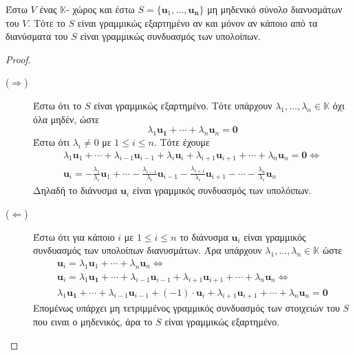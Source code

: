 \begin{thm}\label{thm:s1s2depend}
    Έστω $V$ ένας $ \mathbb{K} $- χώρος και έστω 
    $ S = \{ \mathbf{u}_{1}, \ldots, \mathbf{u_{n}} \} $ μη μηδενικό σύνολο 
    διανυσμάτων του $V$. Τότε το $S$ είναι γραμμικώς εξαρτημένο αν και μόνον αν 
    κάποιο από τα διανύσματα του $S$ είναι γραμμικώς συνδυασμός των υπολοίπων. 
\end{thm}
\begin{proof}
\item {}
    \begin{description}
        \item [($ \Rightarrow $)] Έστω ότι το $S$ είναι γραμμικώς εξαρτημένο. Τότε 
            υπάρχουν $ \lambda _{1}, \ldots, \lambda_{n} \in \mathbb{K} $ όχι 
            όλα μηδέν, ώστε 
            \[
                \lambda _{1} \mathbf{u_{1}} + \cdots + \lambda _{n} \mathbf{u}_{n} = 
                \mathbf{0}  
            \] 
            Έστω ότι $ \lambda _{i} \neq 0 $ με $ 1 \leq i \leq n $. Τότε έχουμε
            \begin{align*}
                \lambda _{1} \mathbf{u}_{1} + \cdots + \lambda _{i-1} 
                \mathbf{u}_{i-1} + \lambda _{i} \mathbf{u}_{i} + \lambda _{i+1} 
                \mathbf{u}_{i+1} + \cdots + \lambda _{n}
                \mathbf{u}_{n} = \mathbf{0} \Leftrightarrow  \\
                \mathbf{u}_{i} = - \frac{\lambda _{1}}{\lambda _{i}} \mathbf{u}_{1} +
                \cdots - \frac{\lambda _{i-1}}{\lambda _{i}} \mathbf{u}_{i-1} - 
                \frac{\lambda _{i+1}}{\lambda _{i}} \mathbf{u}_{i+1} - 
                \cdots - \frac{\lambda _{n}}{\lambda _{i}} \mathbf{u}_{n} 
             \end{align*} 
             Δηλαδή το διάνυσμα $ \mathbf{u}_{i} $ είναι γραμμικός συνδυασμός των 
             υπολόιπων.
         \item [($\Leftarrow$)] 
             Έστω ότι για κάποιο $ i $ με $ 1 \leq i \leq n $ το διάνυσμα 
             $ \mathbf{u}_{i} $ είναι γραμμικός συνδυασμός των υπολοίπων διανυσμάτων.
             Άρα υπάρχουν $ \lambda _{1}, \ldots, \lambda _{n} \in \mathbb{K} $ 
             ώστε 
             \begin{gather*}
                 \mathbf{u}_{i} = \lambda _{1} \mathbf{u}_{1} + \cdots + 
                 \lambda _{n} \mathbf{u}_{n} \Leftrightarrow \\
                 \mathbf{u}_{i} = \lambda _{1} \mathbf{u_{1}} + \cdots + 
                 \lambda _{i-1}
                 \mathbf{u}_{i-1} + \lambda _{i+1} \mathbf{u}_{i+1} + \cdots + 
                 \lambda _{n} \mathbf{u}_{n} \Leftrightarrow \\
                 \lambda _{1} \mathbf{u_{1}} + \cdots + \lambda _{i-1}
                 \mathbf{u}_{i-1} + (-1) \cdot \mathbf{u}_{i} + \lambda _{i+1} 
                 \mathbf{u}_{i+1} + \cdots + \lambda _{n} \mathbf{u}_{n} = \mathbf{0}
             \end{gather*}
             Επομένως υπάρχει μη τετριμμένος γραμμικός συνδυασμός των στοιχειών του 
             $S$ που ειναι ο μηδενικός, άρα το $S$ είναι γραμμικώς εξαρτημένο.
    \end{description}
\end{proof}
